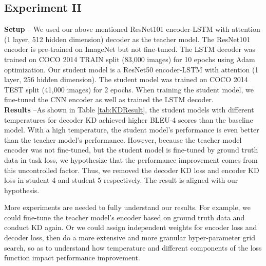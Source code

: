\documentclass[10pt,twocolumn,letterpaper]{article}
\begin{document}
\subsection{Experiment II}

\textbf{Setup} -- We used our above mentioned ResNet101 encoder-LSTM with attention (1 layer, 512 hidden dimension) decoder as the teacher model. The ResNet101 encoder is pre-trained on ImageNet but not fine-tuned. The LSTM decoder was trained on COCO 2014 TRAIN split (83,000 images) for 10 epochs using Adam optimization. Our student model is a ResNet50 encoder-LSTM with attention (1 layer, 256 hidden dimension). The student model was trained on COCO 2014 TEST split (41,000 images) for 2 epochs. When training the student model, we fine-tuned the CNN encoder as well as trained the LSTM decoder.\\

\textbf{Results} --As shown in Table \ref{tab:KDResult}, the student models with different temperatures for decoder KD achieved higher BLEU-4 scores than the baseline model. With a high temperature, the student model's performance is even better than the teacher model's performance. However, because the teacher model encoder was not fine-tuned, but the student model is fine-tuned by ground truth data in task loss, we hypothesize that the performance improvement comes from this uncontrolled factor. Thus, we removed the decoder KD loss and encoder KD loss in student 4 and student 5 respectively. The result is aligned with our hypothesis.

More experiments are needed to fully understand our results. For example, we could fine-tune the teacher model's encoder based on ground truth data and conduct KD again. Or we could assign independent weights for encoder loss and decoder loss, then do a more extensive and more granular hyper-parameter grid search, so as to understand how temperature and different components of the loss function impact performance improvement.
\end{document}
